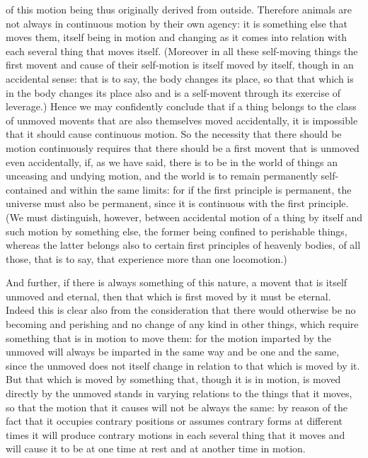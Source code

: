 of this motion being thus originally derived from outside. Therefore
animals are not always in continuous motion by their own agency: it
is something else that moves them, itself being in motion and changing
as it comes into relation with each several thing that moves itself.
(Moreover in all these self-moving things the first movent and cause
of their self-motion is itself moved by itself, though in an accidental
sense: that is to say, the body changes its place, so that that which
is in the body changes its place also and is a self-movent through
its exercise of leverage.) Hence we may confidently conclude that
if a thing belongs to the class of unmoved movents that are also themselves
moved accidentally, it is impossible that it should cause continuous
motion. So the necessity that there should be motion continuously
requires that there should be a first movent that is unmoved even
accidentally, if, as we have said, there is to be in the world of
things an unceasing and undying motion, and the world is to remain
permanently self-contained and within the same limits: for if the
first principle is permanent, the universe must also be permanent,
since it is continuous with the first principle. (We must distinguish,
however, between accidental motion of a thing by itself and such motion
by something else, the former being confined to perishable things,
whereas the latter belongs also to certain first principles of heavenly
bodies, of all those, that is to say, that experience more than one
locomotion.) 

And further, if there is always something of this nature, a movent
that is itself unmoved and eternal, then that which is first moved
by it must be eternal. Indeed this is clear also from the consideration
that there would otherwise be no becoming and perishing and no change
of any kind in other things, which require something that is in motion
to move them: for the motion imparted by the unmoved will always be
imparted in the same way and be one and the same, since the unmoved
does not itself change in relation to that which is moved by it. But
that which is moved by something that, though it is in motion, is
moved directly by the unmoved stands in varying relations to the things
that it moves, so that the motion that it causes will not be always
the same: by reason of the fact that it occupies contrary positions
or assumes contrary forms at different times it will produce contrary
motions in each several thing that it moves and will cause it to be
at one time at rest and at another time in motion. 

